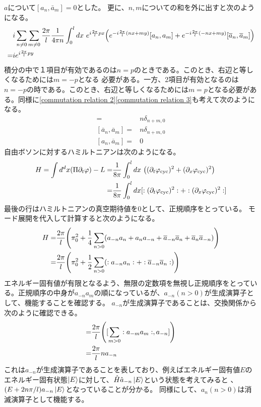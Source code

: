 \documentclass[11pt, dvipdfmx]{article}
\numberwithin{equation}{section}
\begin{document}
$a$について$[a_n,\bar{a}_m]=0$とした。
更に、$n,m$についての和を外に出すと次のようになる。
\begin{align}
    &i\sum_{n\neq 0}\sum_{m\neq 0}\frac{2\pi}{l}\frac{1}{4\pi n}\int_0^l dx \ e^{i\frac{2\pi}{l}p x}\qty(e^{-i\frac{2\pi}{l}(n x + m y)}[ a_n , a_m] + e^{-i\frac{2\pi}{l}(-n x + m y)}[ \overline{a}_n , \overline{a}_m])\\
    =&i e^{i\frac{2\pi}{l}p y}
\end{align}
積分の中で１項目が有効であるのは$n=p$のときである。このとき、右辺と等しくなるためには$m=-p$となる
必要がある。一方、2項目が有効となるのは$n=-p$の時である。このとき、右辺と等しくなるためには$m=p$となる必要がある。同様に\eqref{commutation relation 2}\eqref{commutation relation 3}も考えて次のようになる。
\begin{align}
[a_n , a_m]=& n \delta_{n+m,0}\\
[\overline{a}_n , \overline{a}_m]=& n \delta_{n+m,0}
\\
[a_n , \overline{a}_m]=& 0
\end{align}
自由ボソンに対するハミルトニアンは次のようになる。
\begin{align}
    H=\int d^dx (\Pi \partial_t \varphi) - L=&\frac{1}{8\pi}\int_0^l dx \ \qty((\partial_t \varphi_{\text{cyc}})^2 + (\partial_x \varphi_{\text{cyc}})^2) \\
    =&\frac{1}{8\pi}\int_0^l dx[:(\partial_t \varphi_{\text{cyc}})^2: + :(\partial_x \varphi_{\text{cyc}})^2: ]
\end{align}
最後の行はハミルトニアンの真空期待値を0として、正規順序をとっている。
モード展開を代入して計算すると次のようになる。
\begin{align}
    H=&\frac{2\pi}{l}\qty(\pi_0^2 + \frac{1}{4}\sum_{n>0} (a_{-n} a_n + a_n a_{-n} + \overline{a}_{-n} \overline{a}_n + \overline{a}_n \overline{a}_{-n}))\\
    =&\frac{2\pi}{l}\qty(\pi_0^2 + \frac{1}{2}\sum_{n>0} (:a_{-n} a_n: + :\overline{a}_{-n} \overline{a}_n:))\label{hamiltonian}
\end{align}
エネルギー固有値が有限となるよう、無限の定数項を無視し正規順序をとっている。正規順序の中身が$a_{-n}a_m$の順になっているが、$a_{-n}(n>0)$が生成演算子として、機能することを確認する。
$a_{-n}$が生成演算子であることは、交換関係から次のように確認できる。
\begin{align}
    [H,a_{-n}]=&\frac{2\pi}{l}\qty([ \sum_{m>0} :a_{-m} a_m: , a_{-n}])\\
    =&\frac{2\pi}{l}na_{-n}
\end{align}
これは$a_{-n}$が生成演算子であることを表しており、例えばエネルギー固有値$E$のエネルギー固有状態$\ket{E}$に対して、$\hat{H}\hat{a}_{-n}\ket{E}$という状態を考えてみると
、$(E+2n\pi/l)a_{-n}\ket{E}$となっていることが分かる。
同様にして、$a_n (n>0)$は消滅演算子として機能する。
\end{document}
